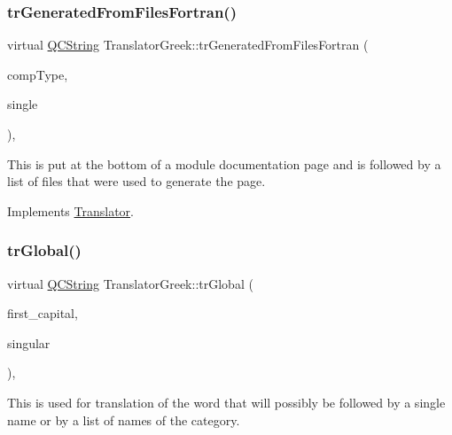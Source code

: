 \mbox{\label{class_translator_greek_a7d3a753214e3d7d92b7b9c12eefea3fb}} 
\subsubsection{\texorpdfstring{trGeneratedFromFilesFortran()}{trGeneratedFromFilesFortran()}}
{\footnotesize\ttfamily virtual \mbox{\hyperlink{class_q_c_string}{Q\+C\+String}} Translator\+Greek\+::tr\+Generated\+From\+Files\+Fortran (\begin{DoxyParamCaption}\item[{\mbox{\hyperlink{class_class_def_ae70cf86d35fe954a94c566fbcfc87939}{Class\+Def\+::\+Compound\+Type}}}]{comp\+Type,  }\item[{bool}]{single }\end{DoxyParamCaption})\hspace{0.3cm}{\ttfamily [inline]}, {\ttfamily [virtual]}}

This is put at the bottom of a module documentation page and is followed by a list of files that were used to generate the page. 

Implements \mbox{\hyperlink{class_translator}{Translator}}.

\mbox{\label{class_translator_greek_a07d0ebd30a35e4c1cfa6ec97de0ce306}} 
\subsubsection{\texorpdfstring{trGlobal()}{trGlobal()}}
{\footnotesize\ttfamily virtual \mbox{\hyperlink{class_q_c_string}{Q\+C\+String}} Translator\+Greek\+::tr\+Global (\begin{DoxyParamCaption}\item[{bool}]{first\+\_\+capital,  }\item[{bool}]{singular }\end{DoxyParamCaption})\hspace{0.3cm}{\ttfamily [inline]}, {\ttfamily [virtual]}}

This is used for translation of the word that will possibly be followed by a single name or by a list of names of the category. 


